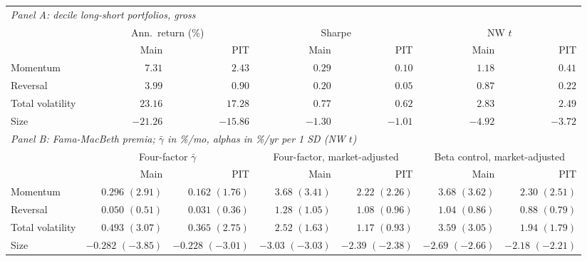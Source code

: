 \begin{tabular}{lrrrrrr}
\toprule
\multicolumn{7}{l}{\textit{Panel A: decile long-short portfolios, gross}} \\
& \multicolumn{2}{c}{Ann.\ return (\%)} & \multicolumn{2}{c}{Sharpe} & \multicolumn{2}{c}{NW $t$} \\
& Main & PIT & Main & PIT & Main & PIT \\
\midrule
Momentum & $7.31$ & $2.43$ & $0.29$ & $0.10$ & $1.18$ & $0.41$ \\
Reversal & $3.99$ & $0.90$ & $0.20$ & $0.05$ & $0.87$ & $0.22$ \\
Total volatility & $23.16$ & $17.28$ & $0.77$ & $0.62$ & $2.83$ & $2.49$ \\
Size & $-21.26$ & $-15.86$ & $-1.30$ & $-1.01$ & $-4.92$ & $-3.72$ \\
\midrule
\multicolumn{7}{l}{\textit{Panel B: Fama-MacBeth premia; $\bar\gamma$ in \%/mo, alphas in \%/yr per 1 SD (NW $t$)}} \\
& \multicolumn{2}{c}{Four-factor $\bar\gamma$} & \multicolumn{2}{c}{Four-factor, market-adjusted} & \multicolumn{2}{c}{Beta control, market-adjusted} \\
& Main & PIT & Main & PIT & Main & PIT \\
\midrule
Momentum & $0.296$ $(2.91)$ & $0.162$ $(1.76)$ & $3.68$ $(3.41)$ & $2.22$ $(2.26)$ & $3.68$ $(3.62)$ & $2.30$ $(2.51)$ \\
Reversal & $0.050$ $(0.51)$ & $0.031$ $(0.36)$ & $1.28$ $(1.05)$ & $1.08$ $(0.96)$ & $1.04$ $(0.86)$ & $0.88$ $(0.79)$ \\
Total volatility & $0.493$ $(3.07)$ & $0.365$ $(2.75)$ & $2.52$ $(1.63)$ & $1.17$ $(0.93)$ & $3.59$ $(3.05)$ & $1.94$ $(1.79)$ \\
Size & $-0.282$ $(-3.85)$ & $-0.228$ $(-3.01)$ & $-3.03$ $(-3.03)$ & $-2.39$ $(-2.38)$ & $-2.69$ $(-2.66)$ & $-2.18$ $(-2.21)$ \\
\bottomrule
\end{tabular}

